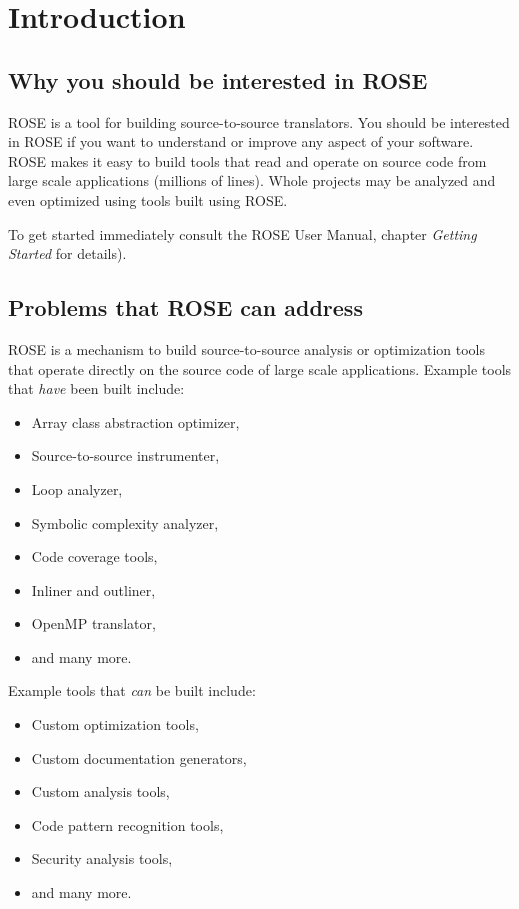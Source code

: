 \chapter{Introduction}

\section{Why you should be interested in ROSE}
ROSE is a tool for building source-to-source translators.
You should be interested in ROSE if you want to 
understand or improve any aspect of your software. ROSE
makes it easy to build tools that read and operate on source code
from large scale applications (millions of lines).  Whole projects
may be analyzed and even optimized using tools built using ROSE.

To get started immediately consult the ROSE User Manual, chapter
{\em Getting Started} for details).

\section{Problems that ROSE can address}
    ROSE is a mechanism to build source-to-source analysis or 
optimization tools that operate directly on the source code of large 
scale applications.  Example tools that {\em have} been built include:
\begin{itemize}
   \item Array class abstraction optimizer,
   \item Source-to-source instrumenter,
   \item Loop analyzer,
   \item Symbolic complexity analyzer,
   \item Code coverage tools,
   \item Inliner and outliner,
   \item OpenMP translator,
   \item and many more.
\end{itemize}
Example tools that {\em can} be built include:
\begin{itemize}
   \item Custom optimization tools,
   \item Custom documentation generators,
   \item Custom analysis tools,
   \item Code pattern recognition tools,
   \item Security analysis tools,
   \item and many more.
\end{itemize}



